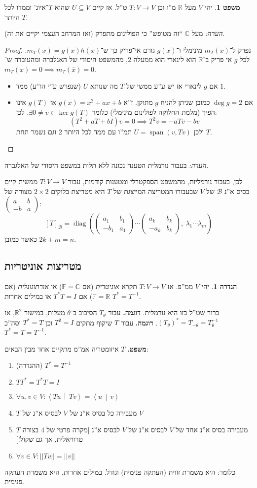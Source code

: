 \documentclass[a4paper]{article}
\newcommand\R     {\mathbb{R}}
\newcommand\C     {\mathbb{C}}
\newcommand\bc    {\mathcal{B}}
\newcommand\ra    {\rangle}
\newcommand\la    {\langle}
\DeclareMathOperator{\diag}    {diag}
\DeclareMathOperator{\Sp}      {span}
\newcommand\F         {\mathbb{F}}
\newcommand\co        {\colon}
\newcommand\pms[1]    {\begin{pmatrix}
		#1
\end{pmatrix}}
\newcommand\norm[1]   {\left \vert \left \vert #1 \right \vert \right \vert}
\newcommand\mut [2]   {\left \la #1 \,\middle\vert\, #2 \right \ra}
\newcommand\tg        {\theta}
\renewcommand\lg      {\lambda}
\newcommand\op    {^{-1}}
\newcommand\cl [1]    {\left ( #1 \right )}
\theoremstyle{definition}
\newtheorem{Theorem}{משפט}
\newtheorem{definition}{הגדרה}
\newcommand\theo  [1] {\begin{Theorem}#1\end{Theorem}}
\newcommand\defi  [1] {\begin{definition}#1\end{definition}}
\begin{document}
	\theo{יהי $V$ מעל $\R$ מ''ו וכן $T \co V \to V$ ט''ל. אז קיים $U \subseteq V$ שהוא $T$־איונ' וממדו לכל היותר $T$. }
	\textit{הערה: }מעל $\C$ ``זה מטופש'' כי הפולינום מתפרק (ואז המרחב העצמי יקיים את זה). 
	\begin{proof}
		נפרק ל־$m_T(x)$ מינימלי ו־$g(x)$ גורם אי־פריק כך ש־$m_T(x) = g(x)h(x)$. לכל $g$ אי פריק ב־$\R$ הוא לינארי  הוא ממעלה $2$, מהמשפט היסודי של האגלברה ומהעובדה ש־$m_T(x) = 0 \implies m_T(\bar x) = 0$. 
		\begin{itemize}
			\item אם $g$ לינארי אז יש ע''ע ממשי של $T$ מה שנותא $U$ (שנפרש ע''י הו''ע) ממד $1$. 
			\item אם $\deg g = 2$ כמובן שניתן להניח $g$ מתוקן. ז''א $g(x) = x^2 + ax + b$ אז $g(T)$ אינו הפיך (מלמת החלוקה לפולינום מינימלי) כלומר $\exists 0 \neq v \in \ker g(T)$. 
			לכן: 
			\[ (T^2 + aT + bI)v = 0 \implies T^2v = -a T v - bv \]
			ולכן $U = \Sp(v, Tv)$ תמ''ו עם ממד לכל היותר 2 וגם נשמר תחת $T$. 
		\end{itemize}
	\end{proof}
	
	\textit{הערה: }בעבור נורמלית הטענה נכונה ללא תלות במשפט היסודי של האלגברה. 
	
	לכן, בעבור נורמליות, מהמשפט הספקטרלי ומטענות קודמות, עבור $T \co V \to V$ ממשית קיים בסיס א''נ $\bc$ של $V$ שבעבורו המטריצה המייצגת של $T$ היא מטריצת בלוקים $2 \times 2$ מצורה של $\pms{a & b \\ -b & a}$: 
	\[ [T]_\bc = \diag\cl{\pms{a_1 & b_1 \\ -b_1 & a_1} \cdots \pms{a_k & b_k \\ -a_k & b_k}, \ \lg_1 \cdots \lg_m} \]
	כאשר כמובן $2k + m = n$. 
	
	\subsection{מטריצות אוניטריות}
	\defi{יהי $V$ ממ''פ. אז $T \co V \to V$ תקרא \textit{אוניטרית} (אם $\F = \C$) או \textit{אורתוגונלית} (אם $\F = \R$) אם $T^*T = I$ או במילים אחרות $T^* = T\op$. }
	ברור שט''ל כזו היא נורמלית. 
	\textbf{דוגמה. }עבור $T_\tg$ הסיבוב ב־$\tg$ מעלות, במישור $\R^2$, אז $(T_\tg)^* = T_{-\tg} = T\op_{\tg}$.  
	\textbf{דוגמה. }עבור $T$ שיקוף מתקים $T^2 = I$ וכן $T^* = T$ וסה''כ $T^* = T = T\op$. 

	\textbf{משפט. }$T$ איזומטריה אמ''מ מתקיים אחד מבין הבאים: 
	\begin{enumerate}
		\item (ההגדרה) \hfil $T^* = T\op$
		\item \hfil $TT^* = T^*T = I$
		\item \hfil $\forall u, v \in V \co \mut{Tu}{Tv} = \mut{u}{v}$
		\item $T$ מעבירה כל בסיס א''נ של $V$ לבסיס א''נ של $V$
		\item $T$ מעבירה בסיס א''נ אחד של $V$ לבסיס א''נ של $V$ לבסיס א''נ [מקרה פרטי של 4 בצורה טרוויאלית, אך גם שקול!]
		\item \hfil $\forall v \in V \co \norm{Tv} = \norm{v}$
	\end{enumerate}
	כלומר: היא משמרת זווית (העתקה פנימית) וגודל. במילים אחרות, היא משמרת העתקה פנימית. 
	
\end{document}
